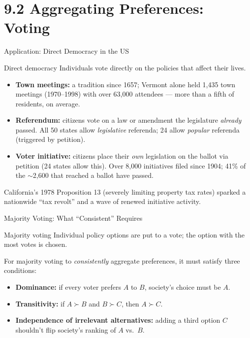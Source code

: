 \documentclass[11pt,aspectratio=169]{beamer}
\begin{document}
\section{9.2 Aggregating Preferences: Voting}

\begin{frame}{Application: Direct Democracy in the US}
  \begin{block}{Direct democracy}
    Individuals vote directly on the policies that affect their lives.
  \end{block}
  \begin{itemize}
    \item \textbf{Town meetings:} a tradition since 1657; Vermont alone held 1,435 town meetings (1970--1998) with over 63,000 attendees --- more than a fifth of residents, on average.
    \item \textbf{Referendum:} citizens vote on a law or amendment the legislature \emph{already} passed. All 50 states allow \emph{legislative} referenda; 24 allow \emph{popular} referenda (triggered by petition).
    \item \textbf{Voter initiative:} citizens place their \emph{own} legislation on the ballot via petition (24 states allow this). Over 8,000 initiatives filed since 1904; 41\% of the $\sim$2,600 that reached a ballot have passed.
  \end{itemize}
  \small California's 1978 Proposition 13 (severely limiting property tax rates) sparked a nationwide ``tax revolt'' and a wave of renewed initiative activity.
\end{frame}

\begin{frame}{Majority Voting: What ``Consistent'' Requires}
  \begin{block}{Majority voting}
    Individual policy options are put to a vote; the option with the most votes is chosen.
  \end{block}
  For majority voting to \emph{consistently} aggregate preferences, it must satisfy three conditions:
  \begin{itemize}
    \item \textbf{Dominance:} if every voter prefers $A$ to $B$, society's choice must be $A$.
    \item \textbf{Transitivity:} if $A \succ B$ and $B \succ C$, then $A \succ C$.
    \item \textbf{Independence of irrelevant alternatives:} adding a third option $C$ shouldn't flip society's ranking of $A$ vs.\ $B$.
  \end{itemize}
\end{frame}
\end{document}
